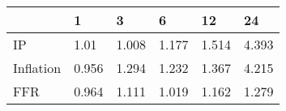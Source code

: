 \begin{tabular}{llllll}
\toprule 
& 1 & 3 & 6 & 12 & 24 \\ 
\midrule 
IP & 1.01 & 1.008 & 1.177 & 1.514 & 4.393 \\ 
Inflation & 0.956 & 1.294 & 1.232 & 1.367 & 4.215 \\ 
FFR & 0.964 & 1.111 & 1.019 & 1.162 & 1.279 \\ 
\bottomrule 
\end{tabular}